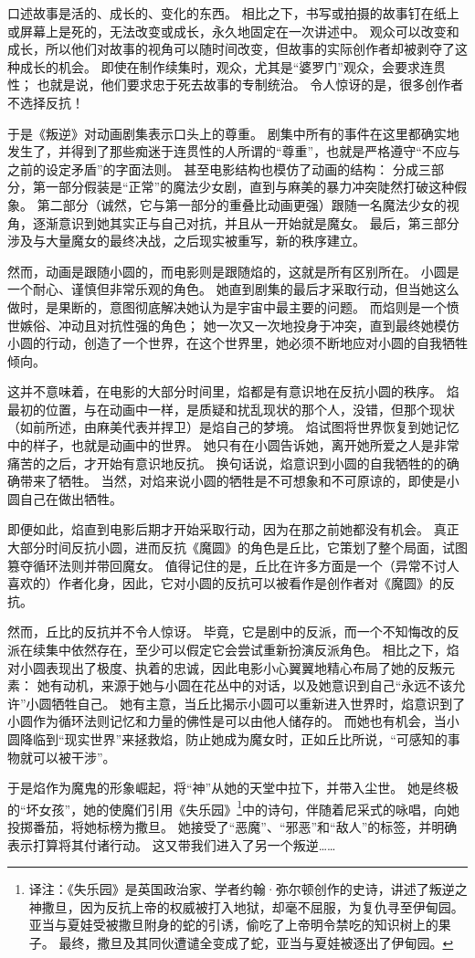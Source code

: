 口述故事是活的、成长的、变化的东西。
相比之下，书写或拍摄的故事钉在纸上或屏幕上是死的，无法改变或成长，永久地固定在一次讲述中。
观众可以改变和成长，所以他们对故事的视角可以随时间改变，但故事的实际创作者却被剥夺了这种成长的机会。
即使在制作续集时，观众，尤其是“婆罗门”观众，会要求连贯性；
也就是说，他们要求忠于死去故事的专制统治。
令人惊讶的是，很多创作者不选择反抗！

于是《叛逆》对动画剧集表示口头上的尊重。
剧集中所有的事件在这里都确实地发生了，并得到了那些痴迷于连贯性的人所谓的“尊重”，也就是严格遵守“不应与之前的设定矛盾”的字面法则。
甚至电影结构也模仿了动画的结构：
分成三部分，第一部分假装是“正常”的魔法少女剧，直到与麻美的暴力冲突陡然打破这种假象。
第二部分（诚然，它与第一部分的重叠比动画更强）跟随一名魔法少女的视角，逐渐意识到她其实正与自己对抗，并且从一开始就是魔女。
最后，第三部分涉及与大量魔女的最终决战，之后现实被重写，新的秩序建立。

然而，动画是跟随小圆的，而电影则是跟随焰的，这就是所有区别所在。
小圆是一个耐心、谨慎但非常乐观的角色。
她直到剧集的最后才采取行动，但当她这么做时，是果断的，意图彻底解决她认为是宇宙中最主要的问题。
而焰则是一个愤世嫉俗、冲动且对抗性强的角色；
她一次又一次地投身于冲突，直到最终她模仿小圆的行动，创造了一个世界，在这个世界里，她必须不断地应对小圆的自我牺牲倾向。

这并不意味着，在电影的大部分时间里，焰都是有意识地在反抗小圆的秩序。
焰最初的位置，与在动画中一样，是质疑和扰乱现状的那个人，没错，但那个现状（如前所述，由麻美代表并捍卫）是焰自己的梦境。
焰试图将世界恢复到她记忆中的样子，也就是动画中的世界。
她只有在小圆告诉她，离开她所爱之人是非常痛苦的之后，才开始有意识地反抗。
换句话说，焰意识到小圆的自我牺牲的的确确带来了牺牲。
当然，对焰来说小圆的牺牲是不可想象和不可原谅的，即使是小圆自己在做出牺牲。

即便如此，焰直到电影后期才开始采取行动，因为在那之前她都没有机会。
真正大部分时间反抗小圆，进而反抗《魔圆》的角色是丘比，它策划了整个局面，试图篡夺循环法则并带回魔女。
值得记住的是，丘比在许多方面是一个（异常不讨人喜欢的）作者化身，因此，它对小圆的反抗可以被看作是创作者对《魔圆》的反抗。

然而，丘比的反抗并不令人惊讶。
毕竟，它是剧中的反派，而一个不知悔改的反派在续集中依然存在，至少可以假定它会尝试重新扮演反派角色。
相比之下，焰对小圆表现出了极度、执着的忠诚，因此电影小心翼翼地精心布局了她的反叛元素：
她有动机，来源于她与小圆在花丛中的对话，以及她意识到自己“永远不该允许”小圆牺牲自己。
她有主意，当丘比揭示小圆可以重新进入世界时，焰意识到了小圆作为循环法则记忆和力量的佛性是可以由他人储存的。
而她也有机会，当小圆降临到“现实世界”来拯救焰，防止她成为魔女时，正如丘比所说，“可感知的事物就可以被干涉”。

于是焰作为魔鬼的形象崛起，将“神”从她的天堂中拉下，并带入尘世。
她是终极的“坏女孩”，她的使魔们引用《失乐园》\footnote{%
    译注：《失乐园》是英国政治家、学者约翰·弥尔顿创作的史诗，讲述了叛逆之神撒旦，因为反抗上帝的权威被打入地狱，却毫不屈服，为复仇寻至伊甸园。
    亚当与夏娃受被撒旦附身的蛇的引诱，偷吃了上帝明令禁吃的知识树上的果子。
    最终，撒旦及其同伙遭谴全变成了蛇，亚当与夏娃被逐出了伊甸园。
}中的诗句，伴随着尼采式的咏唱，向她投掷番茄，将她标榜为撒旦。
她接受了“恶魔”、“邪恶”和“敌人”的标签，并明确表示打算将其付诸行动。
这又带我们进入了另一个叛逆……
